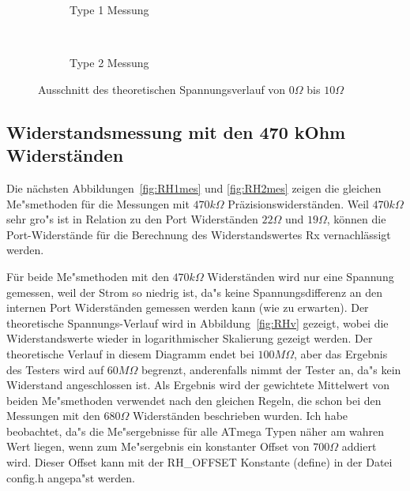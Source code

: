 \begin{figure}[H]
  \begin{subfigure}[b]{9cm}
    \centering
    \resizebox{9cm}{!}{}
    \caption{Type 1 Messung}
    \label{fig:RLvlow}
  \end{subfigure}
  ~
  \begin{subfigure}[b]{9cm}
    \centering
    \resizebox{9cm}{!}{}
    \caption{Type 2 Messung}
    \label{fig:RLvhigh}
  \end{subfigure}
  \caption{Ausschnitt des theoretischen Spannungsverlauf von \(0\Omega\) bis \(10\Omega\)}
\end{figure}


\subsection{Widerstandsmessung mit den 470 kOhm Widerst\"anden}
Die n\"achsten Abbildungen~\ref{fig:RH1mes} und \ref{fig:RH2mes} zeigen die gleichen Me"smethoden f\"ur die Messungen mit
 \(470k\Omega\) Pr\"azisionswiderst\"anden.
Weil \(470k\Omega\) sehr gro"s ist in Relation zu den Port Widerst\"anden \(22\Omega\) und \(19\Omega\), 
k\"onnen die Port-Widerst\"ande f\"ur die Berechnung des Widerstandswertes Rx vernachl\"assigt werden.

F\"ur beide Me"smethoden mit den \(470k\Omega\) Widerst\"anden wird nur eine Spannung gemessen, weil der Strom
so niedrig ist, da"s keine Spannungsdifferenz an den internen Port Widerst\"anden gemessen werden kann (wie zu erwarten).
Der theoretische Spannungs-Verlauf wird in Abbildung~\ref{fig:RHv} gezeigt, wobei die Widerstandswerte wieder in
logarithmischer Skalierung gezeigt werden.
Der theoretische Verlauf in diesem Diagramm endet bei \(100M\Omega\), aber das Ergebnis des Testers wird auf
 \(60M\Omega\) begrenzt, anderenfalls nimmt der Tester an, da"s kein Widerstand angeschlossen ist.
Als Ergebnis wird der gewichtete Mittelwert von beiden Me"smethoden verwendet nach den gleichen Regeln, die schon bei
den Messungen mit den  \(680\Omega\) Widerst\"anden beschrieben wurden.
Ich habe beobachtet, da"s die Me"sergebnisse f\"ur alle ATmega Typen  n\"aher am wahren Wert liegen, wenn zum Me"sergebnis
ein konstanter Offset von \(700\Omega\) addiert wird.
Dieser Offset kann mit der RH\_OFFSET Konstante (define) in der Datei config.h angepa"st werden.

